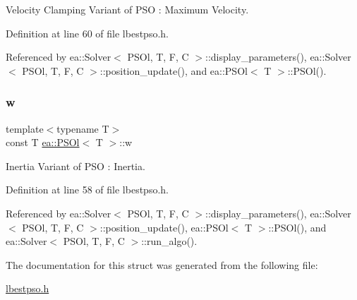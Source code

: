 Velocity Clamping Variant of P\+SO \+: Maximum Velocity. 



Definition at line 60 of file lbestpso.\+h.



Referenced by ea\+::\+Solver$<$ P\+S\+Ol, T, F, C $>$\+::display\+\_\+parameters(), ea\+::\+Solver$<$ P\+S\+Ol, T, F, C $>$\+::position\+\_\+update(), and ea\+::\+P\+S\+Ol$<$ T $>$\+::\+P\+S\+Ol().

\mbox{\label{structea_1_1_p_s_ol_a0c4742b6ff551a0c616fc64e093e6611}} 
\subsubsection{\texorpdfstring{w}{w}}
{\footnotesize\ttfamily template$<$typename T$>$ \\
const T \hyperlink{structea_1_1_p_s_ol}{ea\+::\+P\+S\+Ol}$<$ T $>$\+::w}



Inertia Variant of P\+SO \+: Inertia. 



Definition at line 58 of file lbestpso.\+h.



Referenced by ea\+::\+Solver$<$ P\+S\+Ol, T, F, C $>$\+::display\+\_\+parameters(), ea\+::\+Solver$<$ P\+S\+Ol, T, F, C $>$\+::position\+\_\+update(), ea\+::\+P\+S\+Ol$<$ T $>$\+::\+P\+S\+Ol(), and ea\+::\+Solver$<$ P\+S\+Ol, T, F, C $>$\+::run\+\_\+algo().



The documentation for this struct was generated from the following file\+:\begin{DoxyCompactItemize}
\item 
\hyperlink{lbestpso_8h}{lbestpso.\+h}\end{DoxyCompactItemize}

